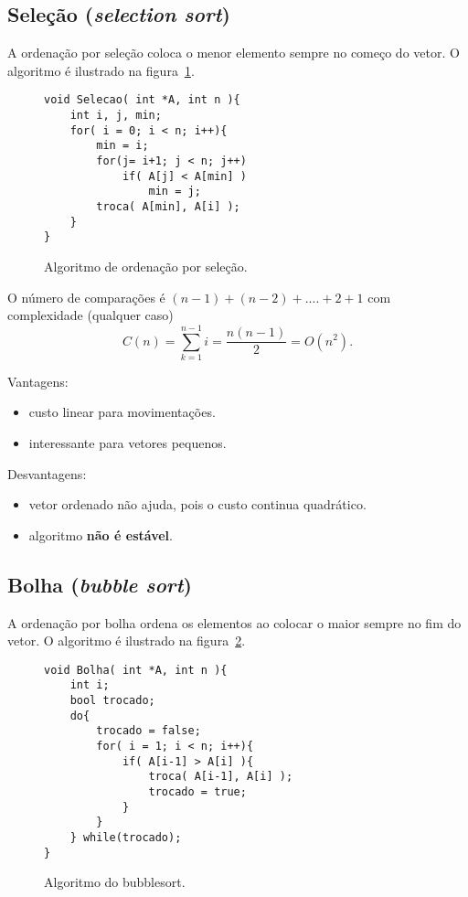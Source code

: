 \subsection{Seleção (\emph{selection sort})}

A ordenação por seleção coloca o menor elemento sempre no começo do vetor.
O algoritmo é ilustrado na figura~\ref{aula03:algo:selection}.
\begin{figure}[!htb]
\centering
\begin{framed}
\begin{lstlisting}
void Selecao( int *A, int n ){
	int i, j, min;
	for( i = 0; i < n; i++){
		min = i;
		for(j= i+1; j < n; j++)
			if( A[j] < A[min] )
				min = j;
		troca( A[min], A[i] );
	}
}
\end{lstlisting}
\end{framed}
\caption{Algoritmo de ordenação por seleção.}
\label{aula03:algo:selection}
\end{figure}


O número de comparações é $(n-1)+(n-2)+....+2+1$ com complexidade (qualquer caso)
\begin{equation*}
C(n) = \sum_{k=1}^{n-1} i = \frac{n(n-1)}{2} = O(n^2).
\end{equation*}

Vantagens:
\begin{itemize}
\item custo linear para movimentações.
\item interessante para vetores pequenos.
\end{itemize}
Desvantagens:
\begin{itemize}
\item vetor ordenado não ajuda, pois o custo continua quadrático.
\item algoritmo {\bf não é estável}.
\end{itemize}

\subsection{Bolha (\emph{bubble sort})}

A ordenação por bolha ordena os elementos ao colocar o maior sempre no fim do vetor.
O algoritmo é ilustrado na figura~\ref{aula03:algo:bubblesort}.
\begin{figure}[!htb]
\centering
\begin{framed}
\begin{lstlisting}
void Bolha( int *A, int n ){
	int i;
	bool trocado;
	do{
		trocado = false;
		for( i = 1; i < n; i++){
			if( A[i-1] > A[i] ){
				troca( A[i-1], A[i] );
				trocado = true;
			}
		}
	} while(trocado);
}
\end{lstlisting}
\end{framed}
\caption{Algoritmo do bubblesort.}
\label{aula03:algo:bubblesort}
\end{figure}

